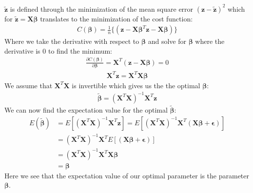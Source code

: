 \documentclass[12pt]{article}
\begin{document}
$\boldsymbol{\tilde{z}}$ is defined through the minimization of the mean square error $(\boldsymbol{z} - \boldsymbol{\tilde{z}})^2$ which for $\boldsymbol{\tilde{z}} = \boldsymbol{X}\boldsymbol{\beta}$ translates to the minimization of the cost function:
\begin{align*}
  C(\boldsymbol{\beta}) = \frac{1}{ n}\{(\boldsymbol{z}- \boldsymbol{X}\boldsymbol{\beta}^T\boldsymbol{z}- \boldsymbol{X}\boldsymbol{\beta})\}
\end{align*}
Where we take the derivative with respect to $\boldsymbol{\beta}$ and solve for $\boldsymbol{\beta}$ where the derivative is 0 to find the minimum:
\begin{align*}
  \frac{\partial C(\boldsymbol{\beta})}{\partial \boldsymbol{\beta}} = \boldsymbol{X}^T (\boldsymbol{z}- \boldsymbol{X}\boldsymbol{\beta}) =0
\end{align*}
\begin{align*}
  \boldsymbol{X}^T\boldsymbol{z} = \boldsymbol{X}^T \boldsymbol{X}\boldsymbol{\beta}
\end{align*}
We assume that $\boldsymbol{X}^T\boldsymbol{X}$ is invertible which gives us the the optimal $\boldsymbol{\beta}$:
\begin{align*}
  \boldsymbol{\tilde{\beta}} = (\boldsymbol{X}^T\boldsymbol{X})^{-1} \boldsymbol{X}^T\boldsymbol{z}
\end{align*}
We can now find the expectation value for the optimal $\boldsymbol{\tilde{\beta}}$:
\begin{align*}
  E(\boldsymbol{\tilde{\beta}}) &= E[(\boldsymbol{X}^T\boldsymbol{X})^{-1} \boldsymbol{X}^T\boldsymbol{z}] = E[(\boldsymbol{X}^T\boldsymbol{X})^{-1} \boldsymbol{X}^T(\boldsymbol{X}\boldsymbol{\beta} + \boldsymbol {\epsilon} )] \\
  &=  (\boldsymbol{X}^T\boldsymbol{X})^{-1} \boldsymbol{X}^TE[(\boldsymbol{X}\boldsymbol{\beta} + \boldsymbol {\epsilon} )] \\ &= (\boldsymbol{X}^T\boldsymbol{X})^{-1} \boldsymbol{X}^T\boldsymbol{X}\boldsymbol{\beta} \\&=  \boldsymbol{\beta}
\end{align*}
Here we see that the expectation value of our optimal parameter is the parameter $\boldsymbol{\beta}$.
\end{document}
